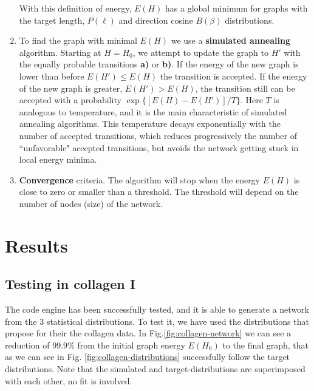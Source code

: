 \begin{enumerate}[label=\textbf{\Roman*}]
  With this definition of energy, $E(H)$ has a global minimum for graphs with
  the target length, $P(\ell)$ and direction cosine $B(\beta)$ distributions.
  
  \item To find the graph with minimal $E(H)$ we use a \textbf{simulated
  annealing} algorithm. Starting at $H=H_0$, we attempt to update the graph to
  $H'$ with the equally probable transitions \textbf{a)} or \textbf{b)}.  If the
  energy of the new graph is lower than before $E(H')\leq E(H)$ the transition
  is accepted. If the energy of the new graph is greater, $E(H')> E(H)$, the
  transition still can be accepted with a probability $\exp\{[E(H)-E(H')]/T\}$.
  Here $T$ is  analogous to temperature, and it is the main characteristic of
  simulated annealing algorithms. This temperature decays exponentially with the number of accepted transitions, which reduces
  progressively the number of ``unfavorable" accepted transitions, but avoids
  the network getting stuck in local energy minima.
  \item \textbf{Convergence} criteria. The algorithm will stop when the energy
  $E(H)$ is close to zero or smaller than a threshold.
  The threshold will depend on the number of nodes (size) of the network.
\end{enumerate} 

\section{Results}
\subsection{Testing in collagen I}
The code engine has been successfully tested, and it is able to
generate a network from the $3$ statistical distributions. To test it, we have
used the distributions that \citet{lindstrom_biopolymer_2010} propose for their
the collagen data. In Fig.\ref{fig:collagen-network} we
can see a reduction of $99.9\%$ from the initial graph energy $E(H_0)$ to the
final graph, that as we can see in Fig.
\ref{fig:collagen-distributions} successfully follow the target distributions. 
Note that the
simulated and target-distributions are superimposed with each other, no fit is involved. 

